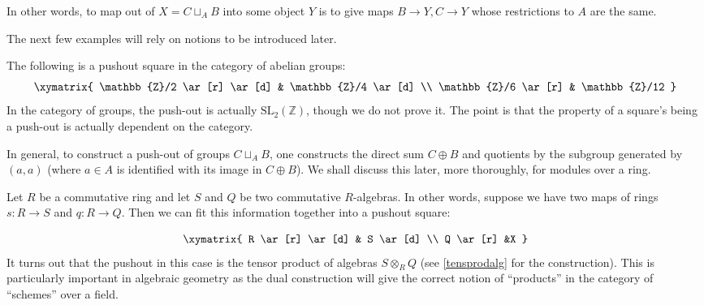 In other words, to map out of $X = C \sqcup_A B$ into some object $Y$ is to
give maps $B \to Y, C \to Y$ whose restrictions to $A$ are the same.


The next few examples will rely on notions to be introduced later.
\begin{example}
The following is a pushout square in the category of abelian groups:
\[ \xymatrix{
\mathbb{Z}/2 \ar[r] \ar[d]  &  \mathbb{Z}/4 \ar[d]  \\
\mathbb{Z}/6 \ar[r] &  \mathbb{Z}/12
}\]
In the category of groups, the push-out is actually
$\mathrm{SL}_2(\mathbb{Z})$, though we do not prove it. The point is that
the property of a square's being a
push-out is actually dependent on the category.

In general, to construct a push-out of groups $C \sqcup_A B$, one constructs
the direct sum $C \oplus B$ and quotients by the subgroup generated by
$(a, a)$ (where $a \in A$ is identified with its image in $C \oplus B$).
We shall discuss this later, more thoroughly, for modules over a ring.
\end{example}

\begin{example}
Let $R$ be a commutative ring and let $S$ and $Q$ be two commutative
$R$-algebras. In other words, suppose
we have two maps of rings $s:R\rightarrow S$ and $q:R\rightarrow Q$. Then we
can fit this information together
into a pushout square:

\[ \xymatrix{
R \ar[r] \ar[d]  &  S \ar[d]   \\
Q \ar[r] &X
}\]
It turns out that the pushout in this case is the tensor product of algebras
$S\otimes_R Q$ (see \cref{tensprodalg} for the construction). This is particularly important
in algebraic geometry as the dual construction will give the correct notion of
``products'' in the category of ``schemes'' over
a field.\end{example}

